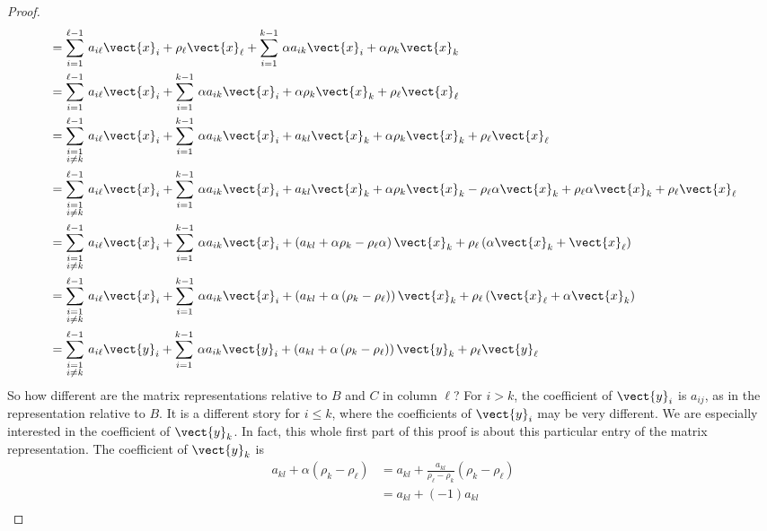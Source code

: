 \begin{proof}
\begin{align*}
%
&=\sum_{i=1}^{\ell-1}\,a_{i\ell}\vect{x}_i + \rho_\ell\vect{x}_\ell+
\sum_{i=1}^{k-1}\,\alpha a_{ik}\vect{x}_i + \alpha\rho_k\vect{x}_k\\
%
&=\sum_{i=1}^{\ell-1}\,a_{i\ell}\vect{x}_i + \sum_{i=1}^{k-1}\,\alpha a_{ik}\vect{x}_i +
 \alpha\rho_k\vect{x}_k + \rho_\ell\vect{x}_\ell\\
%
&=\sum_{\substack{i=1\\i\neq k}}^{\ell-1}\,a_{i\ell}\vect{x}_i +
\sum_{i=1}^{k-1}\,\alpha a_{ik}\vect{x}_i +
a_{kl}\vect{x}_k + \alpha\rho_k\vect{x}_k + \rho_\ell\vect{x}_\ell\\
%
&=\sum_{\substack{i=1\\i\neq k}}^{\ell-1}\,a_{i\ell}\vect{x}_i +
\sum_{i=1}^{k-1}\,\alpha a_{ik}\vect{x}_i +
a_{kl}\vect{x}_k + \alpha\rho_k\vect{x}_k - \rho_\ell\alpha\vect{x}_k +  \rho_\ell\alpha\vect{x}_k + \rho_\ell\vect{x}_\ell\\
%
&=\sum_{\substack{i=1\\i\neq k}}^{\ell-1}\,a_{i\ell}\vect{x}_i +
\sum_{i=1}^{k-1}\,\alpha a_{ik}\vect{x}_i +
\left(a_{kl}+\alpha\rho_k-\rho_\ell\alpha\right)\vect{x}_k +\rho_\ell\left(\alpha\vect{x}_k+\vect{x}_\ell\right)\\
%
&=\sum_{\substack{i=1\\i\neq k}}^{\ell-1}\,a_{i\ell}\vect{x}_i +
\sum_{i=1}^{k-1}\,\alpha a_{ik}\vect{x}_i +
\left(a_{kl}+\alpha\left(\rho_k-\rho_\ell\right)\right)\vect{x}_k +\rho_\ell\left(\vect{x}_\ell+\alpha\vect{x}_k\right)\\
%
&=\sum_{\substack{i=1\\i\neq k}}^{\ell-1}\,a_{i\ell}\vect{y}_i +
\sum_{i=1}^{k-1}\,\alpha a_{ik}\vect{y}_i +
\left(a_{kl}+\alpha\left(\rho_k-\rho_\ell\right)\right)\vect{y}_k +\rho_\ell\vect{y}_\ell
%
\end{align*}
%
So how different are the matrix representations relative to $B$ and $C$ in column $\ell$?  For $i>k$, the coefficient of $\vect{y}_i$ is $a_{ij}$, as in the representation relative to $B$.  It is a different story for $i\leq k$, where the coefficients of $\vect{y}_i$ may be very different.  We are especially interested in the coefficient of $\vect{y}_k$.  In fact, this whole first part of this proof is about this particular entry of the matrix representation.  The coefficient of  $\vect{y}_k$ is
%
\begin{align*}
a_{kl}+\alpha\left(\rho_k-\rho_\ell\right)
&=a_{kl}+\frac{a_{kl}}{\rho_\ell-\rho_k}\left(\rho_k-\rho_\ell\right)\\
&=a_{kl}+(-1)a_{kl}\\

\end{align*}
\end{proof}
